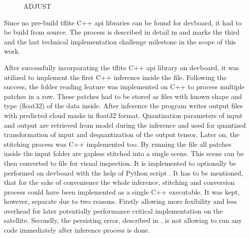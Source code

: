 {\begin{figure}[H]
{%
}
\caption{ADJUST}
\end{figure}

Since no pre-build \gls{tflite} C++ \gls{api} libraries can be found for \gls{devboard}, it had to be build from source.
The process is described in detail in 
and marks the third and the last technical implementation challenge milestone in the scope of this work.

After successfully incorporating the \gls{tflite} C++ \gls{api} library on \gls{devboard},
it was utilized to implement the first C++ inference inside the  file. Following the success,
the folder reading feature was implemented on C++ to process multiple patches in a row.
These patches had to be stored as  files with known shape and type (\gls{float32}) of the data inside.
After inference the program writes output  files with predicted cloud masks in \gls{float32} format.
Quantization parameters of input and output are retrieved from model during the inference and used for quantized transformation of input and dequantization of the output tensor.
Later on, the stitching process was C++ implemented too.
By running the  file all  patches inside the input folder are gapless stitched into a single  scene.
This  scene can be then converted to  file for visual inspection.
It is implemented to optionally be performed on \gls{devboard} with the help of Python script .
It has to be mentioned, that for the sake of convenience the whole inference, stitching and conversion process could have been implemented as a single C++ executable.
It was kept, however, separate due to two reasons. Firstly allowing more fexibility and less overhead for later potentially performance critical implementation on the satellite.
Secondly, the persisting error, described in , is not allowing to run any code immediately after inference process is done.

}
